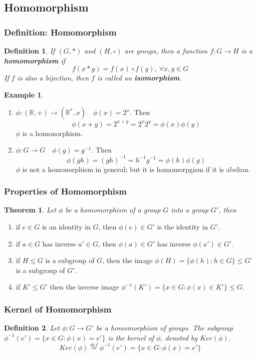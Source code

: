 \documentclass[11pt,a4paper]{article}
\newtheorem{theorem}{Theorem}
\newtheorem{example}{Example}
\newtheorem{definition}{Definition}
\begin{document}
\subsection{Homomorphism}
\subsubsection{Definition: Homomorphism}
\begin{definition}
If $(G,*)$ and $(H,\circ)$ are groups, then a function $f:G \rightarrow	H$ is a \textbf{homomorphism} if $$f(x*y)=f(x)\circ f(y),\ \forall x,y\in G$$
If $f$ is also a bijection, then $f$ is called an \textbf{isomorphism}.
\end{definition}

\begin{example}
\end{example}
\begin{enumerate}
    \item $\phi: (\mathbb{R},+) \rightarrow	(\mathbb{R}^*,x)\quad \phi(x)=2^x$. Then
    $$\phi(x+y)=2^{x+y}=2^x2^y=\phi(x)\phi(y)$$ $\phi$ is a homonorphism.
    \item $\phi: G \rightarrow	G\quad \phi(g)=g^{-1}$. Then
    $$\phi(gh)=(gh)^{-1}=h^{-1}g^{-1}=\phi(h)\phi(g)$$ $\phi$ is not a homonorphism in general; but it is homomorpgism if it is abelian.
\end{enumerate}

\subsubsection{Properties of Homomorphism}
\begin{theorem}
    Let $\phi$ be a homomorphism of a group $G$ into a group $G'$, then
\end{theorem}
\begin{enumerate}
    \item if $e\in G$ is an identity in $G$, then $\phi(e)\in G'$ is the identity in $G'$.
    \item if $a\in G$ has inverse $a'\in G$, then $\phi(a)\in G'$ has inverse $\phi(a')\in G'$.
    \item if $H\leq G$ is a subgroup of $G$, then the image $\phi(H)=\{\phi(h):h\in G\}\leq G'$ is a subgroup of $G'$.
    \item if $K'\leq G'$ then the inverse image $\phi^{-1}(K')=\{x\in G:\phi(x)\in K'\}\leq G$.
\end{enumerate}

\subsubsection{Kernel of Homomorphism}
\begin{definition}
    Let $\phi: G \rightarrow G'$ be a homomorphism of groups. The subgroup $\phi^{-1}(e')=\{x\in G:\phi(x)=e'\}$ is the kernel of $\phi$, denoted by $Ker (\phi)$.
    $$Ker (\phi) \stackrel{def}{=} \phi^{-1}(e')=\{x\in G:\phi(x)=e'\}$$
\end{definition}
\end{document}

